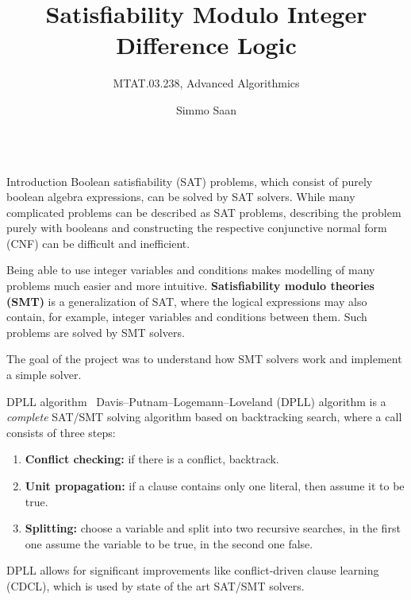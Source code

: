\documentclass{beamer}
\title{Satisfiability Modulo Integer Difference Logic}
\subtitle{MTAT.03.238, Advanced Algorithmics}
\author{Simmo Saan}
\institute{Institute of Computer Science, University of Tartu}
\date{}
\begin{document}

\begin{frame}[fragile,t]
\maketitle

\begin{columns}[t,onlytextwidth]
	\begin{column}{0.485\textwidth}
		\begin{block}{Introduction}
			Boolean satisfiability (SAT) problems, which consist of purely boolean algebra expressions, can be solved by SAT solvers. While many complicated problems can be described as SAT problems, describing the problem purely with booleans and constructing the respective conjunctive normal form (CNF) can be difficult and inefficient.

			Being able to use integer variables and conditions makes modelling of many problems much easier and more intuitive. \textbf{Satisfiability modulo theories (SMT)} is a generalization of SAT, where the logical expressions may also contain, for example, integer variables and conditions between them. Such problems are solved by SMT solvers.

			The goal of the project was to understand how SMT solvers work and implement a simple solver.
		\end{block}
	
		\begin{block}{DPLL algorithm~\cite{DPLLmethod}}
			Davis–Putnam–Logemann–Loveland (DPLL) algorithm is a \emph{complete} SAT/SMT solving algorithm based on backtracking search, where a call consists of three steps:
			\begin{enumerate}
				\item \textbf{Conflict checking:} if there is a conflict, backtrack.
				\item \textbf{Unit propagation:} if a clause contains only one literal, then assume it to be true.
				\item \textbf{Splitting:} choose a variable and split into two recursive searches, in the first one assume the variable to be true, in the second one false.
			\end{enumerate}
		
			DPLL allows for significant improvements like conflict-driven clause learning (CDCL), which is used by state of the art SAT/SMT solvers.
		\end{block}
	

\end{column}
\end{columns}
\end{frame}
\end{document}
